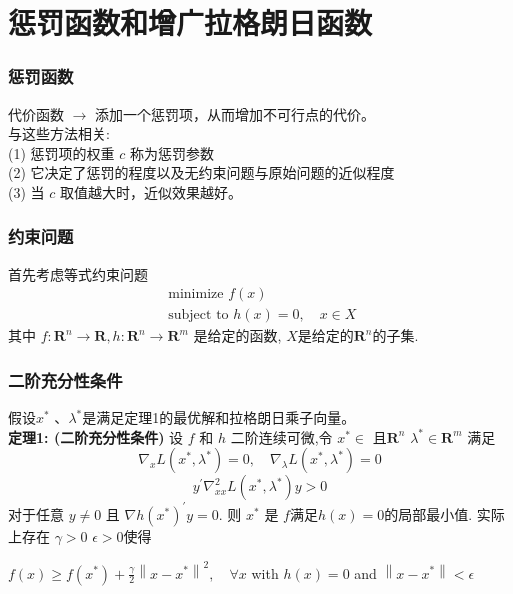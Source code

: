 \documentclass[handout,10pt]{beamer} %
\begin{document}
\section{惩罚函数和增广拉格朗日函数}


\begin{frame}
\frametitle{惩罚函数}

 代价函数 $\rightarrow$   添加一个惩罚项，从而增加不可行点的代价。\\
\bigskip
与这些方法相关:\\
\qquad (1) 惩罚项的权重 $c$ 称为惩罚参数\\
\qquad (2) 它决定了惩罚的程度以及无约束问题与原始问题的近似程度 \\
\qquad (3) 当 $c$ 取值越大时，近似效果越好。
\end{frame}

\begin{frame}
\frametitle{约束问题}
首先考虑等式约束问题
\begin{equation}
\begin{array}{l}
\text { minimize } f(x)\\
\text { subject to } h(x)=0, \quad x \in X
\end{array}
\end{equation}
其中 ${f\colon\mathbf{R}^{n}\to\mathbf{R},h\colon\mathbf{R}^{n}\to\mathbf{R}^{m}}$ 是给定的函数,  $X$是给定的${\mathbf{R}^{n}}$的子集.
\end{frame}


\begin{frame}
\frametitle{二阶充分性条件}
假设$x^*$ 、$\lambda^*$是满足定理1的最优解和拉格朗日乘子向量。\\
\bigskip
\textbf{定理1: (二阶充分性条件)} 设 $f$ 和 $h$ 二阶连续可微,令 $x^{*} \in$ 且$\mathbf{R}^{n}$  $\lambda^{*} \in \mathbf{R}^{m}$ 满足
$$
\nabla_{x} L\left(x^{*}, \lambda^{*}\right)=0, \quad \nabla_{\lambda} L\left(x^{*}, \lambda^{*}\right)=0
$$
$$
y^{\prime} \nabla_{x x}^{2} L\left(x^{*}, \lambda^{*}\right) y>0
$$
对于任意 $y \neq 0$ 且 $\nabla h\left(x^{*}\right)^{\prime} y=0$.
则 $x^{*}$ 是 $f$满足$h(x)=0 $的局部最小值. 实际上存在 $\gamma>0$  $\epsilon>0$使得\\
\begin{center}
$f(x) \geq f\left(x^{*}\right)+\frac{\gamma}{2}\left\|x-x^{*}\right\|^{2}, \quad \forall x$ with $h(x)=0$ and $\left\|x-x^{*}\right\|<\epsilon$
\end{center}
\end{frame}
\end{document}
